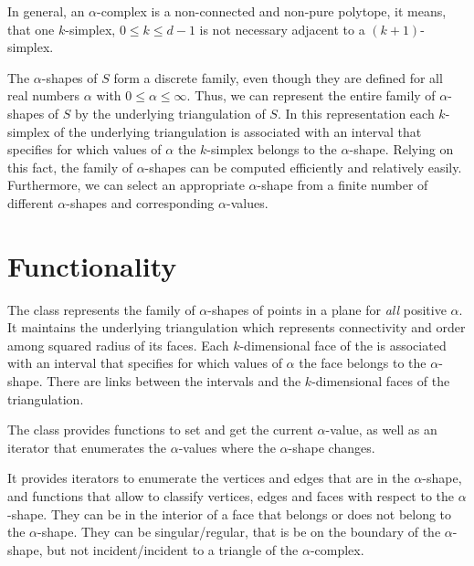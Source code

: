 In general, an $\alpha$-complex is a non-connected and non-pure polytope, it
means, that one $k$-simplex, $0 \leq k \leq d-1$ is not necessary adjacent to
a $(k+1)$-simplex.

The $\alpha$-shapes of $S$ form a discrete family, even though they
are defined for all real numbers $\alpha$ with $0 \leq \alpha
\leq \infty$. Thus, we can represent the entire family of $\alpha$-shapes
of $S$ by the underlying triangulation of $S$. In this representation
each $k$-simplex of the underlying triangulation is associated with an
interval that specifies for which values of $\alpha$ the $k$-simplex
belongs to the $\alpha$-shape. Relying on this fact, the family of
$\alpha$-shapes can be computed efficiently and relatively
easily. Furthermore, we can select an appropriate $\alpha$-shape from a
finite number of different $\alpha$-shapes and corresponding
$\alpha$-values.




\section{Functionality \label{I1_SectAlpha_Shape_2}}

The class  represents the family of
$\alpha$-shapes of points in a plane for {\em all} positive
$\alpha$. It maintains the underlying triangulation  which
represents connectivity and order among squared radius of its faces. Each
$k$-dimensional face of the  is associated with an interval
that specifies for which values of $\alpha$ the face belongs to the
$\alpha$-shape. There are links between the intervals and the
$k$-dimensional faces of the triangulation.


The class  provides functions to set and
get the current $\alpha$-value, as well as an iterator that enumerates
the $\alpha$-values where the $\alpha$-shape changes.


It provides iterators to enumerate the vertices and edges that are in
the $\alpha$-shape, and functions that allow to classify vertices,
edges and faces with respect to the $\alpha$-shape. They can be in
the interior of a face that belongs or does not belong to the $\alpha$-shape.
They can be singular/regular, that is be on the boundary of the $\alpha$-shape,
but not incident/incident to a triangle of the $\alpha$-complex.

